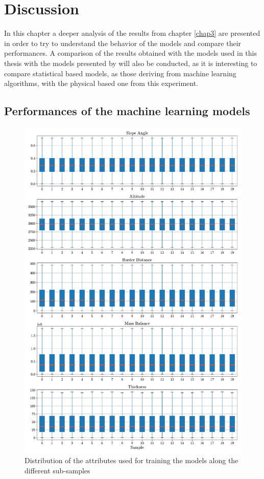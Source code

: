 \chapter{Discussion}\label{disc}
\thispagestyle{plain}
In this chapter a deeper analysis of the results from chapter \ref{chap3} are presented in order to try to understand the behavior of the models and compare their performances. A comparison of the results obtained with the models used in this thesis with the models presented by \cite{Farinotti2019} will also be conducted, as it is interesting to compare statistical based models, as those deriving from machine learning algorithms, with the physical based one from  this experiment.

\section{Performances of the machine learning models}\label{MLcomp}

\begin{figure}[p]
	\centering		  
	\includegraphics[width=1.\textwidth]{figures/samples_distribution.pdf}
	\caption{Distribution of the attributes used for training the models along the different sub-samples}
	\label{fig:distribution}
\end{figure}

